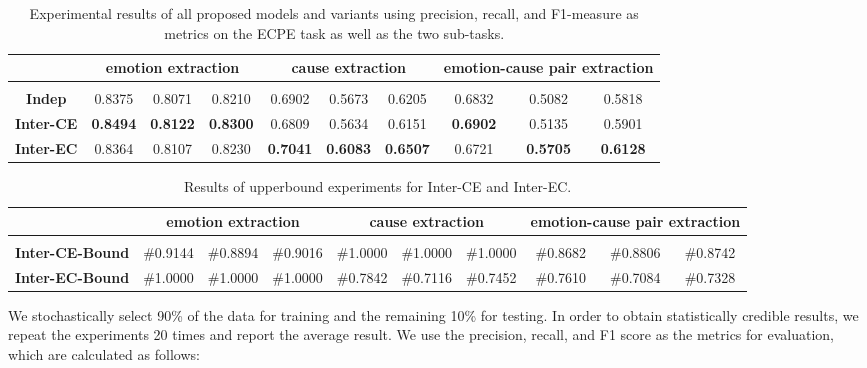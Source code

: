 \documentclass[11pt,a4paper]{article}
\begin{document}
\begin{table*}
	\small
	\centering
	
	\begin{tabular} {c|c|c|c|c|c|c|c|c|c}
		\hline
		  & \multicolumn{3}{|c}{emotion extraction} & \multicolumn{3}{|c}{cause extraction} & \multicolumn{3}{|c}{emotion-cause pair extraction}\\
		\hline
		&  &  &  &  &  &  &  &  &  \\
		\hline
		\textbf{Indep} & 0.8375 & 0.8071 & 0.8210 & 0.6902 & 0.5673 & 0.6205 & 0.6832 & 0.5082 & 0.5818 \\
		\textbf{Inter-CE} & \textbf{0.8494} & \textbf{0.8122} & \textbf{0.8300} & 0.6809 & 0.5634 & 0.6151 & \textbf{0.6902} & 0.5135 & 0.5901\\
		\textbf{Inter-EC} & 0.8364 & 0.8107 & 0.8230 & \textbf{0.7041} & \textbf{0.6083} & \textbf{0.6507} & 0.6721 & \textbf{0.5705} & \textbf{0.6128}\\
		
		\hline
	\end{tabular}
	\caption{Experimental results of all proposed models and variants using precision, recall, and F1-measure as metrics on the ECPE task as well as the two sub-tasks.}
	\label{TableThree}
\end{table*}

\begin{table*}
	\small
	\centering
	
	\begin{tabular} {c|c|c|c|c|c|c|c|c|c}
		\hline
		& \multicolumn{3}{|c}{emotion extraction} & \multicolumn{3}{|c}{cause extraction} & \multicolumn{3}{|c}{emotion-cause pair extraction}\\
		\hline
		&  &  &  &  &  &  &  &  &  \\
		\hline
		\textbf{Inter-CE-Bound} & \#0.9144 & \#0.8894 & \#0.9016 & \#1.0000 & \#1.0000 & \#1.0000 & \#0.8682 & \#0.8806 & \#0.8742\\
		\textbf{Inter-EC-Bound} & \#1.0000 & \#1.0000 & \#1.0000 & \#0.7842 & \#0.7116 & \#0.7452 & \#0.7610 & \#0.7084 & \#0.7328\\
		
		\hline
	\end{tabular}
	\caption{Results of upperbound experiments for Inter-CE and Inter-EC.}
	\label{TableThree2}
\end{table*}

We stochastically select 90\% of the data for training and the remaining 10\% for testing. In order to obtain statistically credible results, we repeat the experiments 20 times and report the average result. We use the precision, recall, and F1 score as the metrics for evaluation, which are calculated as follows:
\end{document}
